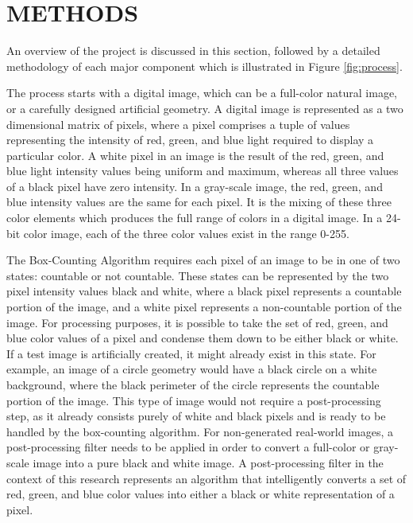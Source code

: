 \documentclass[12pt, oneside]{book}
\begin{document}
% 
%
\chapter{\textbf{METHODS}}
An overview of the project is discussed in this section, followed by a detailed methodology of each major component which is illustrated in Figure \ref{fig:process}.

The process starts with a digital image, which can be a full-color natural image, or a carefully designed artificial geometry.  A digital image is represented as a two dimensional matrix of pixels, where a pixel comprises a tuple of values representing the intensity of red, green, and blue light required to display a particular color. A white pixel in an image is the result of the red, green, and blue light intensity values being uniform and maximum, whereas all three values of a black pixel have zero intensity.  In a gray-scale image, the red, green, and blue intensity values are the same for each pixel.  It is the mixing of these three color elements which produces the full range of colors in a digital image.  In a 24-bit color image, each of the three color values exist in the range 0-255.

The Box-Counting Algorithm requires each pixel of an image to be in one of two states: countable or not countable.  These states can be represented by the two pixel intensity values black and white, where a black pixel represents a countable portion of the image, and a white pixel represents a non-countable portion of the image.  For processing purposes, it is possible to take the set of red, green, and blue color values of a pixel and condense them down to be either black or white.  If a test image is artificially created, it might already exist in this state.  For example, an image of a circle geometry would have a black circle on a white background, where the black perimeter of the circle represents the countable portion of the image.  This type of image would not require a post-processing step, as it already consists purely of white and black pixels and is ready to be handled by the box-counting algorithm. For non-generated real-world images, a post-processing filter needs to be applied in order to convert a full-color or gray-scale image into a pure black and white image.  A post-processing filter in the context of this research represents an algorithm that intelligently converts a set of red, green, and blue color values into either a black or white representation of a pixel.
\end{document}
